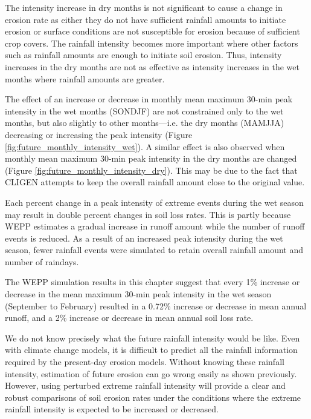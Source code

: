 The intensity increase in dry months is not significant to cause a change in
erosion rate as either they do not have sufficient rainfall amounts to initiate
erosion or surface conditions are not susceptible for erosion because of
sufficient crop covers. The rainfall intensity becomes more important where
other factors such as rainfall amounts are enough to initiate soil erosion.
Thus, intensity increases in the dry months are not as effective as intensity
increases in the wet months where rainfall amounts are greater.

The effect of an increase or decrease in monthly mean maximum 30-min peak
intensity in the wet months (SONDJF) are not constrained only to the wet months,
but also slightly to other months---i.e. the dry months (MAMJJA) decreasing or
increasing the peak intensity (Figure \ref{fig:future_monthly_intensity_wet}). A
similar effect is also observed when monthly mean maximum 30-min peak intensity
in the dry months are changed (Figure \ref{fig:future_monthly_intensity_dry}).
This may be due to the fact that CLIGEN attempts to keep the overall rainfall
amount close to the original value.

Each percent change in a peak intensity of extreme events during the wet season
may result in double percent changes in soil loss rates. This is partly because
WEPP estimates a gradual increase in runoff amount while the number of runoff
events is reduced. As a result of an increased peak intensity during the wet
season, fewer rainfall events were simulated to retain overall rainfall amount
and number of raindays.

The WEPP simulation results in this chapter suggest that every 1\% increase or
decrease in the mean maximum 30-min peak intensity in the wet season (September
to February) resulted in a 0.72\% increase or decrease in mean annual runoff,
and a 2\% increase or decrease in mean annual soil loss rate.

We do not know precisely what the future rainfall intensity would be like. Even
with climate change models, it is difficult to predict all the rainfall
information required by the present-day erosion models. Without knowing these
rainfall intensity, estimation of future erosion can go wrong easily as shown
previously.
However, using perturbed extreme rainfall intensity will provide a clear and
robust comparisons of soil erosion rates under the conditions where the extreme
rainfall intensity is expected to be increased or decreased.


